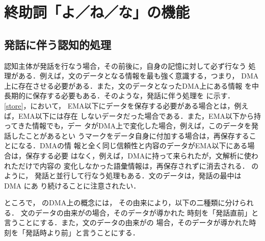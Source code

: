 \section{終助詞「よ／ね／な」の機能} \label{sem}
\subsection{発話に伴う認知的処理} \label{managedata}
認知主体が発話を行なう場合，その前後に，自身の記憶に対して必ず行なう
処理がある．例えば，文のデータとなる情報を最も強く意識する，つまり，
DMA上に存在させる必要がある．また，文のデータとなったDMA上にある情報
を中長期的に保存する必要もある．そのような，発話に伴う処理を
に示す．
\ref{store}，において，
EMA以下にデータを保存する必要がある場合とは，例えば，EMA以下には存在
しないデータだった場合である．また，EMA以下から持ってきた情報でも，デー
タがDMA上で変化した場合，例えば，このデータを発話したことがあるとい
うマークをデータ自身に付加する場合は，再保存することになる．DMAの情
報と全く同じ信頼性と内容のデータがEMA以下にある場合は，保存する必要
はなく，例えば，DMAに持って来られたが，文解析に使われただけで内容の
変化しなかった語彙情報は，再保存されずに消去される．
のように，
発話と並行して行なう処理もある．文のデータは，発話の最中は DMA にあ
り続けることに注意されたい．

ところで，
のDMA上の概念には，
その由来により，以下の二種類に分けられる．
文のデータの由来がの場合，そのデータが導かれた
時刻を「発話直前」と言うことにする．また，文のデータの由来がの
場合，そのデータが導かれた時刻を「発話時より前」と言うことにする．


